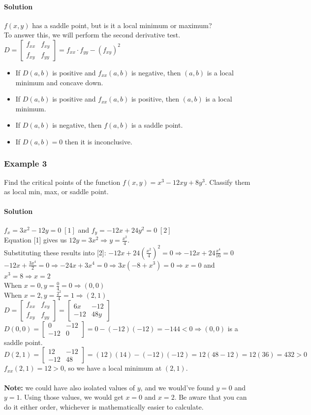 \documentclass{article}
\newcommand{\mat}[4]{\begin{bmatrix} #1 & #2 \\ #3 & #4 \end{bmatrix}}
\begin{document}
\paragraph{Solution} $f(x,y)$ has a saddle point, but is it a local minimum or maximum?
\\To answer this, we will perform the second derivative test.
\\$D=\mat{f_{xx}}{f_{xy}}{f_{xy}}{f_{yy}}=f_{xx}\cdot f_{yy}-(f_{xy})^2$
\begin{itemize}
    \itemsep 0em
    \item If $D(a,b)$ is positive and $f_{xx}(a,b)$ is negative, then $(a,b)$ is a local minimum and concave down.
    \item If $D(a,b)$ is positive and $f_{xx}(a,b)$ is positive, then $(a,b)$ is a local minimum.
    \item If $D(a,b)$ is negative, then $f(a,b)$ is a saddle point.
    \item If $D(a,b)=0$ then it is inconclusive.
\end{itemize}

\subsubsection{Example 3}
Find the critical points of the function $f(x,y)=x^3-12xy+8y^3$. Classify them as local min, max, or saddle point.
\paragraph{Solution} $f_x=3x^2-12y=0\;[1]$ and $f_y=-12x+24y^2=0\;[2]$
\\Equation [1] gives us $12y=3x^2\Rightarrow y=\frac{x^2}{4}$.
\\Substituting these results into [2]: $-12x+24(\frac{x^2}{4})^2=0\Rightarrow -12x+24\frac{x^4}{16}=0$
\\$-12x+\frac{3x^4}{2}=0\Rightarrow -24x+3x^4=0\Rightarrow 3x(-8+x^3)=0\Rightarrow x=0$ and $x^3=8\Rightarrow x=2$
\\When $x=0,y=\frac{0}{4}=0\Rightarrow(0,0)$
\\When $x=2,y=\frac{2^2}{4}=1\Rightarrow(2,1)$
\\$D=\mat{f_{xx}}{f_{xy}}{f_{xy}}{f_{yy}}=\mat{6x}{-12}{-12}{48y}$
\\$D(0,0)=\mat{0}{-12}{-12}{0}=0-(-12)(-12)=-144<0\Rightarrow(0,0)$ is a saddle point.
\\$D(2,1)=\mat{12}{-12}{-12}{48}=(12)(14)-(-12)(-12)=12(48-12)=12(36)=432>0$
\\$f_{xx}(2,1)=12>0$, so we have a local minimum at $(2,1)$.
\\\\\textbf{Note:} we could have also isolated values of $y$, and we would've found $y=0$ and $y=1$. Using those values,
we would get $x=0$ and $x=2$. Be aware that you can do it either order, whichever is mathematically easier to calculate.
\end{document}
